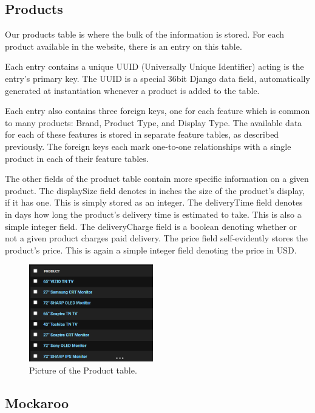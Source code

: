 \documentclass[sigconf]{acmart}
\begin{document}
\subsection{Products}
Our products table is where the bulk of the information is stored. For each product available in the website, there is an entry on this table. \par
Each entry contains a unique UUID (Universally Unique Identifier) acting is the entry's primary key. The UUID is a special 36bit Django data field, automatically generated at instantiation whenever a product is added to the table. \par
Each entry also contains three foreign keys, one for each feature which is common to many products: Brand, Product Type, and Display Type. The available data for each of these features is stored in separate feature tables, as described previously. The foreign keys each mark one-to-one relationships with a single product in each of their feature tables. \par
The other fields of the product table contain more specific information on a given product. The displaySize field denotes in inches the size of the product's display, if it has one. This is simply stored as an integer. The deliveryTime field denotes in days how long the product's delivery time is estimated to take. This is also a simple integer field. The deliveryCharge field is a boolean denoting whether or not a given product charges paid delivery. The price field self-evidently stores the product's price. This is again a simple integer field denoting the price in USD.


\begin{figure}[H] %
	\centering %
	\includegraphics[width=0.48\textwidth]{Figures/product.png} %
	\caption{Picture of the Product table.}
\end{figure}

\subsection{Mockaroo}
\end{document}
